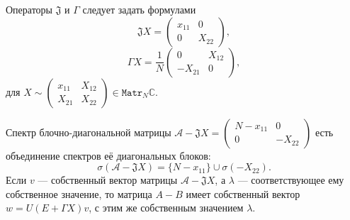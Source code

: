 \begin{lem}
    Операторы \( \mathfrak{J} \) и \( \Gamma \)
    следует задать формулами
    \[
        \mathfrak{J} X = \begin{pmatrix} x_{11} & 0 \\ 0 & X_{22} \end{pmatrix}, \]
    \[
        \Gamma X = \frac{1}{N} \begin{pmatrix} 0 & X_{12} \\ -X_{21} & 0 \end{pmatrix}, \]
        для \( X\sim \begin{pmatrix}x_{11} & X_{12} \\ X_{21} & X_{22}\end{pmatrix} \in \mathtt{Matr}_N\mathbb{C} \).

\end{lem}
\begin{crl}
    Спектр блочно-диагональной матрицы
    \( \mathcal{A} - \mathfrak{J}X = \begin{pmatrix} N - x_{11} & 0 \\ 0 & -X_{22} \end{pmatrix} \)
    есть объединение спектров е\"е диагональных блоков:
    \[
        \sigma(\mathcal{A} - \mathfrak{J} X) = \{ N - x_{11} \} \cup \sigma(-X_{22}). \]
    Если \( v \) --- собственный вектор матрицы \( \mathcal{A} - \mathfrak{J}X \),
    а \( \lambda \) --- соответствующее ему собственное значение,
    то матрица \( A - B \)
    имеет собственный вектор \( w = U(E + \Gamma X)v \),
    с этим же собственным значением \( \lambda \).
\end{crl}
